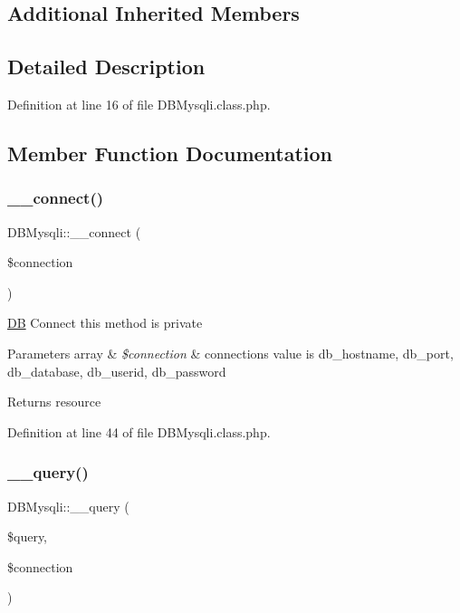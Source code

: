 \subsection*{Additional Inherited Members}


\subsection{Detailed Description}


Definition at line 16 of file D\+B\+Mysqli.\+class.\+php.



\subsection{Member Function Documentation}
\mbox{\label{classDBMysqli_a7c041395f7926e0ec84186aa9eabc138}} 
\subsubsection{\texorpdfstring{\+\_\+\+\_\+connect()}{\_\_connect()}}
{\footnotesize\ttfamily D\+B\+Mysqli\+::\+\_\+\+\_\+connect (\begin{DoxyParamCaption}\item[{}]{\$connection }\end{DoxyParamCaption})}

\hyperlink{classDB}{DB} Connect this method is private 
\begin{DoxyParams}[1]{Parameters}
array & {\em \$connection} & connection\textquotesingle{}s value is db\+\_\+hostname, db\+\_\+port, db\+\_\+database, db\+\_\+userid, db\+\_\+password \\
\hline
\end{DoxyParams}
\begin{DoxyReturn}{Returns}
resource 
\end{DoxyReturn}


Definition at line 44 of file D\+B\+Mysqli.\+class.\+php.

\mbox{\label{classDBMysqli_aa7e47178c283abd8ba1bb7c8d0a31c66}} 
\subsubsection{\texorpdfstring{\+\_\+\+\_\+query()}{\_\_query()}}
{\footnotesize\ttfamily D\+B\+Mysqli\+::\+\_\+\+\_\+query (\begin{DoxyParamCaption}\item[{}]{\$query,  }\item[{}]{\$connection }\end{DoxyParamCaption})}

